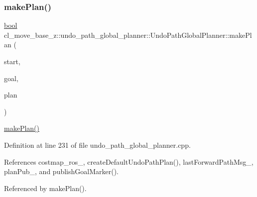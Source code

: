 \subsubsection{\texorpdfstring{make\+Plan()}{makePlan()}\hspace{0.1cm}{\footnotesize\ttfamily [1/2]}}
{\footnotesize\ttfamily \hyperlink{classbool}{bool} cl\+\_\+move\+\_\+base\+\_\+z\+::undo\+\_\+path\+\_\+global\+\_\+planner\+::\+Undo\+Path\+Global\+Planner\+::make\+Plan (\begin{DoxyParamCaption}\item[{const geometry\+\_\+msgs\+::\+Pose\+Stamped \&}]{start,  }\item[{const geometry\+\_\+msgs\+::\+Pose\+Stamped \&}]{goal,  }\item[{std\+::vector$<$ geometry\+\_\+msgs\+::\+Pose\+Stamped $>$ \&}]{plan }\end{DoxyParamCaption})}

\hyperlink{classcl__move__base__z_1_1undo__path__global__planner_1_1UndoPathGlobalPlanner_a46034d27c0811abae440009457a7f8b0}{make\+Plan()} 

Definition at line 231 of file undo\+\_\+path\+\_\+global\+\_\+planner.\+cpp.



References costmap\+\_\+ros\+\_\+, create\+Default\+Undo\+Path\+Plan(), last\+Forward\+Path\+Msg\+\_\+, plan\+Pub\+\_\+, and publish\+Goal\+Marker().



Referenced by make\+Plan().


